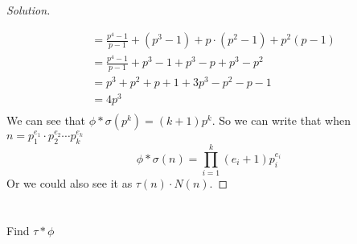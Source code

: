 \documentclass[11pt]{article}
\newenvironment{myproblem}[1][Problem]{\begin{trivlist}
    \item[\hskip \labelsep {\bfseries #1.}]}{\end{trivlist}}
\newenvironment{solution}
  {\renewcommand\qedsymbol{$~$}\begin{proof}[Solution]$ $\par\nobreak\ignorespaces}
  {\end{proof}}
\begin{document}
\begin{solution}
\begin{align*}
                       & =  \frac{p^{4}-1}{p-1} + (p^{3}-1) + p\cdot (p^{2}-1) + p^{2}(p-1)                                          \\
                       & =  \frac{p^{4}-1}{p-1} + p^{3}-1 + p^{3}-p + p^3-p^2                                                        \\
                       & =  p^3+p^2+p+1 + 3p^{3}-p^2 -p-1                                                                            \\
                       & =  4p^3                                                                                                     \\
  \end{align*}
  We can see that $\phi * \sigma(p^k)=(k+1)p^k$. So we can write that when $n=p_1^{e_1}\cdot p_2^{e_2}\cdots p_k^{e_k}$
  \[
    \phi * \sigma(n) = \prod_{i=1}^{k} (e_i+1)p_i^{e_i}
  \]
  Or we could also see it as $\tau(n)\cdot N(n)$.
\end{solution}


\section{}

\begin{myproblem}
  Find $\tau * \phi$
\end{myproblem}
\end{document}
